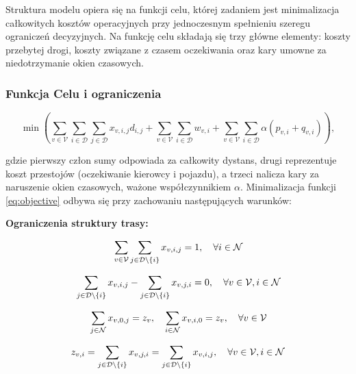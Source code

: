 Struktura modelu opiera się na funkcji celu, której zadaniem jest minimalizacja całkowitych kosztów operacyjnych przy jednoczesnym spełnieniu szeregu ograniczeń decyzyjnych. Na funkcję celu składają się trzy główne elementy: koszty przebytej drogi, koszty związane z czasem oczekiwania oraz kary umowne za niedotrzymanie okien czasowych.

\subsubsection{Funkcja Celu i ograniczenia}
\begin{equation}\label{eq:objective}
     \min \left( \sum_{v \in \mathcal{V}} \sum_{i \in \mathcal{D}} \sum_{j \in \mathcal{D}}  x_{v,i,j} d_{i,j} + \sum_{v \in \mathcal{V}}\sum_{i \in \mathcal{D}} w_{v,i} + \sum_{v \in \mathcal{V}}\sum_{i \in \mathcal{D}} \alpha (p_{v,i} + q_{v,i}) \right),
\end{equation}

gdzie pierwszy człon sumy odpowiada za całkowity dystans, drugi reprezentuje koszt przestojów (oczekiwanie kierowcy i pojazdu), a trzeci nalicza kary za naruszenie okien czasowych, ważone współczynnikiem $\alpha$.
%
Minimalizacja funkcji \eqref{eq:objective} odbywa się przy zachowaniu następujących warunków:

\textbf{Ograniczenia struktury trasy:}

\begin{equation}{\label{eq:one_visit}}
     \sum_{v \in \mathcal{V}}\sum_{j \in \mathcal{D}\setminus \{i\}} x_{v,i,j}=1, \quad \forall i \in \mathcal{N}
\end{equation}

\begin{equation}{\label{eq:flow_balance}}
    \sum_{j\in\mathcal{D}\setminus\{i\}}x_{v,i,j}-\sum_{j\in\mathcal{D}\setminus\{i\}}x_{v,j,i}=0, \quad \forall v \in \mathcal{V}, i \in \mathcal{N}
\end{equation}

\begin{equation}{\label{eq:start_end_in_depot}}
    \sum_{j\in\mathcal{N}}x_{v,0,j}=z_v, \quad \sum_{i\in\mathcal{N}}x_{v,i,0}=z_v, \quad \forall v \in \mathcal{V}
\end{equation}

\begin{equation}{\label{eq:edgevisitcorrelation}}
    z_{v,i} = \sum_{j\in \mathcal{D}\setminus\{i\}}x_{v,j,i} = \sum_{j\in \mathcal{D}\setminus\{i\}}x_{v,i,j}, \quad \forall v \in \mathcal{V}, i \in \mathcal{N}
\end{equation}

